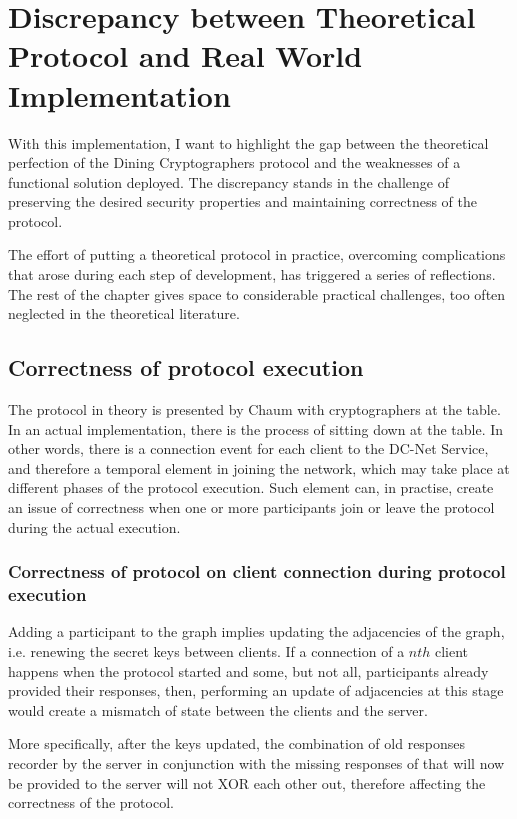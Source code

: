 \section{Discrepancy between Theoretical Protocol and Real World Implementation} \label{sec:collisionDetect}
With this implementation, I want to highlight the gap between the theoretical perfection of the Dining Cryptographers protocol and the weaknesses of a functional solution deployed. The discrepancy stands in the challenge of preserving the desired security properties and maintaining correctness of the protocol. 

The effort of putting a theoretical protocol in practice, overcoming complications that arose during each step of development, has triggered a series of reflections. The rest of the chapter gives space to considerable practical challenges, too often neglected in the theoretical literature.

\subsection{Correctness of protocol execution}
The protocol in theory is presented by Chaum with cryptographers at the table. In an actual implementation, there is the process of sitting down at the table. In other words, there is a connection event for each client to the DC-Net Service, and therefore a temporal element in joining the network, which may take place at different phases of the protocol execution. Such element can, in practise, create an issue of correctness when one or more participants join or leave the protocol during the actual execution.

\subsubsection{Correctness of protocol on client connection during protocol execution}
Adding a participant to the graph implies updating the adjacencies of the graph, i.e. renewing the secret keys between clients. If a connection of a $nth$ client happens when the protocol started and some, but not all, participants already provided their responses, then, performing an update of adjacencies at this stage would create a mismatch of state between the clients and the server.

More specifically, after the keys updated, the combination of old responses recorder by the server in conjunction with the missing responses of that will now be provided to the server will not XOR each other out, therefore affecting the correctness of the protocol.


